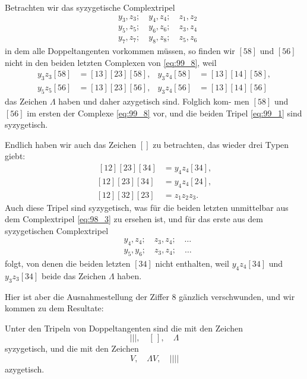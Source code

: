 \documentclass[12pt,a4paper]{article}
\theoremstyle{plain}
\theoremstyle{definition}
\theoremstyle{remark}
\begin{document}
Betrachten wir das syzygetische Complextripel
\begin{equation}\label{eq:99_8}
\begin{aligned}
&y_3, z_3; \quad y_4, z_4; \quad z_1, z_2 \\
&y_5, z_5; \quad y_6, z_6; \quad z_3, z_4 \\
&y_7, z_7; \quad y_8, z_8; \quad z_5, z_6
\end{aligned}
\end{equation}
in dem alle Doppeltangenten vorkommen müssen, so finden wir
$[58]$ und $[56]$ nicht in den beiden letzten Complexen von \eqref{eq:99_8},
weil
\begin{align*}
y_3 z_3 [58] &= [13][23][58], & y_3 z_4 [58] &= [13][14][58], \\
y_5 z_5 [56] &= [13][23][56], & y_3 z_4 [56] &= [13][14][56]
\end{align*}
das Zeichen $\Lambda$ haben und daher azygetisch sind. Folglich kom-
men $[58]$ und $[56]$ im ersten der Complexe \eqref{eq:99_8} vor, und die
beiden Tripel \eqref{eq:99_1} sind syzygetisch.

Endlich haben wir auch das Zeichen $[]$ zu betrachten, das
wieder drei Typen giebt:
\begin{equation}\label{eq:99_10}
\begin{aligned}
\ [12][23][34] &= y_4 z_4 [34], \\
[12][23][34] &= y_4 z_4 [24], \\
[12][32][23] &= z_1 z_2 z_3.
\end{aligned}
\end{equation}
Auch diese Tripel sind syzygetisch, was für die beiden letzten
unmittelbar aus dem Complextripel \eqref{eq:98_3} zu ersehen ist, und für
das erste aus dem syzygetischen Complextripel
\begin{equation*}
\begin{aligned}
&y_4, z_4; \quad z_3, z_4; \quad \ldots \\
&y_5, y_6; \quad z_3, z_4; \quad \ldots
\end{aligned}
\end{equation*}
folgt, von denen die beiden letzten $[34]$ nicht enthalten, weil
$y_4 z_4 [34]$ und $y_3 z_3 [34]$ beide das Zeichen $\Lambda$ haben.

Hier ist aber die Ausnahmestellung der Ziffer 8 gänzlich
verschwunden, und wir kommen zu dem Resultate:

Unter den Tripeln von Doppeltangenten sind
die mit den Zeichen
\begin{equation*}\label{eq:99_symb}
|\!|\!|, \quad [\,], \quad \Lambda
\end{equation*}
syzygetisch, und die mit den Zeichen
\begin{equation*}\label{eq:99_asy}
V, \quad \Lambda V, \quad |\!|\!|\!|
\end{equation*}
azygetisch.
\end{document}
